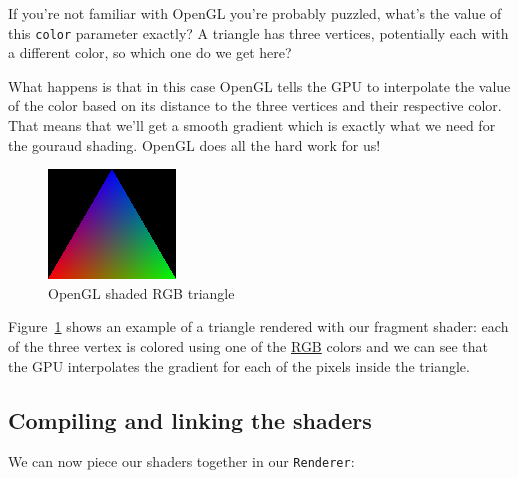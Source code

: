 \documentclass[a4paper]{article}
\newcommand{\code}[1] {\texttt{#1}}
\begin{document}
If you're not familiar with OpenGL you're probably puzzled, what's the
value of this \code{color} parameter exactly? A triangle has three
vertices, potentially each with a different color, so which one do we
get here?

What happens is that in this case OpenGL tells the GPU to interpolate
the value of the color based on its distance to the three vertices and
their respective color. That means that we'll get a smooth gradient
which is exactly what we need for the gouraud shading. OpenGL does all
the hard work for us!

\begin{figure}[ht]
  \centering
  \includegraphics{images/opengl-shaded-triangle}
  \caption{OpenGL shaded RGB triangle}
  \label{fig:opengl_shaded_triangle}
\end{figure}

Figure~\ref{fig:opengl_shaded_triangle} shows an example of a triangle
rendered with our fragment shader: each of the three vertex is colored
using one of the
\href{https://en.wikipedia.org/wiki/RGB_color_model}{RGB} colors and
we can see that the GPU interpolates the gradient for each of the
pixels inside the triangle.

\subsection{Compiling and linking the shaders}

We can now piece our shaders together in our \code{Renderer}:
\end{document}
